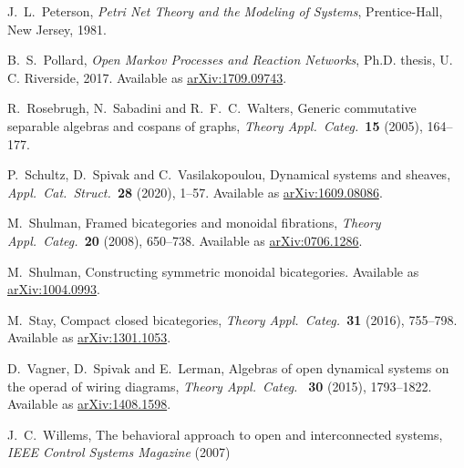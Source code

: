 \documentclass[reqno]{amsart}
\begin{document}
\begin{thebibliography}{100}

 J.\ L.\ Peterson, \textit{Petri Net Theory and the Modeling of Systems}, Prentice-Hall, New Jersey, 1981.  

 B.\ S.\ Pollard, \textsl{Open Markov Processes and Reaction Networks}, Ph.D. thesis, U. C. Riverside, 2017.  Available as \href{https://arxiv.org/abs/1709.09743}{arXiv:1709.09743}.

 R.\ Rosebrugh, N.\ Sabadini and R.\ F.\ C.\ Walters, Generic commutative separable algebras and cospans of graphs, \textsl{Theory Appl.\ Categ.\ }\textbf{15} (2005), 164--177. 


 P.\ Schultz, D.\ Spivak and C.\ Vasilakopoulou, Dynamical systems and sheaves, \textsl{Appl.\ Cat.\ Struct.\ }\textbf{28} (2020), 1--57. Available as \href{https://arxiv.org/abs/1609.08086}{arXiv:1609.08086}.

 M.\ Shulman, Framed bicategories and monoidal fibrations, \textsl{Theory Appl.\ Categ.\ }\textbf{20} (2008), 650--738. Available as \href{https://arxiv.org/abs/0706.1286}{arXiv:0706.1286}.

 M.\ Shulman, Constructing symmetric monoidal bicategories. Available as \href{http://arxiv.org/abs/1004.0993}{arXiv:1004.0993}.

 M.\ Stay, Compact closed bicategories, \textsl{Theory Appl.\ Categ.\ }\textbf{31} (2016), 755--798.   Available as \href{http://arxiv.org/abs/1301.1053}{arXiv:1301.1053}.

 D.\ Vagner, D.\ Spivak and E.\ Lerman, Algebras of open dynamical systems on the operad of wiring diagrams, \textsl{Theory Appl.\ Categ.\ } \textbf{30} (2015), 1793--1822. Available as \href{https://arxiv.org/abs/1408.1598}{arXiv:1408.1598}.

 J.\ C.\ Willems, The behavioral approach to open and interconnected systems, \textsl{IEEE Control Systems Magazine} (2007)

\end{thebibliography}
\end{document}
